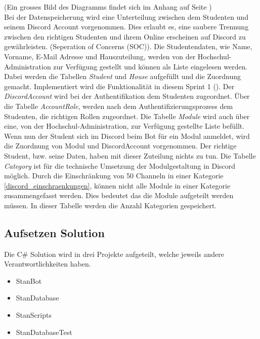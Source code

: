 \documentclass[a4paper, table]{article}
\begin{document}
(Ein grosses Bild des Diagramms findet sich im Anhang auf Seite \pageref*{fig:ER-Diagram-big})\\
Bei der Datenspeicherung wird eine Unterteilung zwischen dem Studenten und seinem Discord Account vorgenommen.
Dies erlaubt es, eine saubere Trennung zwischen den richtigen Studenten und ihrem Online erscheinen auf Discord zu gewährleisten.
(Seperation of Concerns (SOC)).
Die Studentendaten, wie Name, Vorname, E-Mail Adresse und Hauszuteilung, werden von der Hochschul-Administration zur Verfügung gestellt und können als Liste eingelesen werden.
Dabei werden die Tabellen \textit{Student} und \textit{House} aufgefüllt und die Zuordnung gemacht.
Implementiert wird die Funktionalität in diesem Sprint 1 ().
\newline
Der \textit{DiscordAccount} wird bei der Authentifikation dem Studenten zugeordnet.
Über die Tabelle \textit{AccountRole}, werden nach dem Authentifizierungsprozess dem Studenten, die richtigen Rollen zugeordnet.
\newline
Die Tabelle \textit{Module} wird auch über eine, von der Hochschul-Administration, zur Verfügung gestellte Liste befüllt.
Wenn nun der Student sich im Discord beim Bot für ein Modul anmeldet, wird die Zuordnung von Modul und DiscordAccount vorgenommen.
Der richtige Student, \gls{bzw.} seine Daten, haben mit dieser Zuteilung nichts zu tun.
\newline
Die Tabelle \textit{Category} ist für die technische Umsetzung der Modulgestaltung in Discord möglich.
Durch die Einschränkung von 50 Channeln in einer Kategorie \ref{discord_einschraenkungen}, können nicht alle Module in einer Kategorie zusammengefasst werden.
Dies bedeutet das die Module aufgeteilt werden müssen.
In dieser Tabelle werden die Anzahl Kategorien gespeichert.

\subsection{Aufsetzen Solution}
Die C\# Solution wird in drei Projekte aufgeteilt, welche jeweils andere Verantwortlichkeiten haben.
\begin{itemize}
    \item StanBot
    \item StanDatabase
    \item StanScripts
    \item StanDatabaseTest
\end{itemize}
\end{document}
